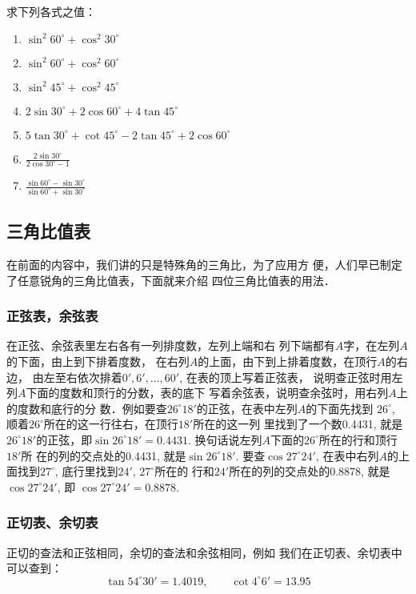 \begin{ex}
    求下列各式之值：
\begin{enumerate}
\item $\sin^2 60^{\circ}+\cos^2 30^{\circ}$
\item $\sin^2 60^{\circ}+\cos^2 60^{\circ}$
\item $\sin^2 45^{\circ}+\cos^2 45^{\circ}$
\item $2\sin30^{\circ}+2\cos60^{\circ}+4\tan 45^{\circ}$
\item $5\tan 30^{\circ}+\cot 45^{\circ}-2\tan 45^{\circ}+2\cos 60^{\circ}$  
\item $\frac{2\sin30^{\circ}}{2\cos30^{\circ}-1}$
\item $\frac{\sin60^{\circ}-\sin30^{\circ}}{\sin60^{\circ}+\sin30^{\circ}}$
\end{enumerate}
\end{ex}

\subsection{三角比值表}
在前面的内容中，我们讲的只是特殊角的三角比，为了应用方
便，人们早已制定了任意锐角的三角比值表，下面就来介绍
四位三角比值表的用法．

\subsubsection{正弦表，余弦表}
在正弦、余弦表里左右各有一列排度数，左列上端和右
列下端都有$A$字，在左列$A$的下面，由上到下排着度数，
在右列$A$的上面，由下到上排着度数，在顶行$A$的右边，
由左至右依次排着$0',6',\ldots,60'$, 在表的顶上写着正弦表，
说明查正弦时用左列$A$下面的度数和顶行的分数，表的底下
写着余弦表，说明查余弦时，用右列$A$上的度数和底行的分
数．例如要查$26^{\circ}18'$的正弦，在表中左列$A$的下面先找到
$26^{\circ}$, 顺着$26^{\circ}$所在的这一行往右，在顶行$18'$所在的这一列
里找到了一个数0.4431, 就是$26^{\circ}18'$的正弦，即$\sin26^{\circ}18'=
0.4431$. 换句话说左列$A$下面的$26^{\circ}$所在的行和顶行$18'$所
在的列的交点处的0.4431, 就是$\sin26^{\circ}18'$. 要查$\cos27^{\circ}24'$, 
在表中右列$A$的上面找到$27^{\circ}$, 底行里找到$24'$, $27^{\circ}$所在的
行和$24'$所在的列的交点处的0.8878, 就是$\cos27^{\circ}24'$, 即
$\cos27^{\circ}24'=0.8878$.

\subsubsection{正切表、余切表}
正切的查法和正弦相同，余切的查法和余弦相同，例如
我们在正切表、余切表中可以查到：
\[\tan 54^{\circ}30'=1.4019,\qquad \cot 4^{\circ}6'=13.95\]

